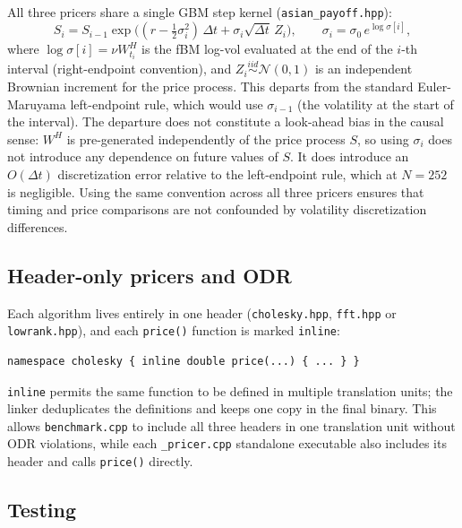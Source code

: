 All three pricers share a single GBM step kernel (\texttt{asian\_payoff.hpp}):
\begin{equation}
  S_i = S_{i-1}\exp\!\bigl((r - \tfrac{1}{2}\sigma_i^2)\,\Delta t
        + \sigma_i\sqrt{\Delta t}\,Z_i\bigr),
  \qquad \sigma_i = \sigma_0\, e^{\log\sigma[i]},
\end{equation}
where $\log\sigma[i] = \nu W_{t_i}^H$ is the fBM log-vol evaluated at the
end of the $i$-th interval (right-endpoint convention), and
$Z_i \overset{iid}{\sim} \mathcal{N}(0,1)$ is an independent Brownian
increment for the price process. This departs from the standard
Euler-Maruyama left-endpoint rule, which would use $\sigma_{i-1}$ (the
volatility at the start of the interval).  The departure does not constitute
a look-ahead bias in the causal sense: $W^H$ is pre-generated independently
of the price process $S$, so using $\sigma_i$ does not introduce any
dependence on future values of $S$.  It does introduce an $O(\Delta t)$
discretization error relative to the left-endpoint rule, which at $N = 252$
is negligible.  Using the same convention across all three pricers ensures
that timing and price comparisons are not confounded by volatility
discretization differences.

\subsection{Header-only pricers and ODR}
\label{sec:odr}

Each algorithm lives entirely in one header (\texttt{cholesky.hpp},
\texttt{fft.hpp} or \texttt{lowrank.hpp}), and each \texttt{price()} function
is marked \texttt{inline}:
\begin{verbatim}
namespace cholesky { inline double price(...) { ... } }
\end{verbatim}
\texttt{inline} permits the same function to be defined in multiple
translation units; the linker deduplicates the definitions and keeps one
copy in the final binary.  This allows \texttt{benchmark.cpp} to include all
three headers in one translation unit without ODR violations, while each
\texttt{\_pricer.cpp} standalone executable also includes its header and
calls \texttt{price()} directly.

\subsection{Testing}
\label{sec:tests}


